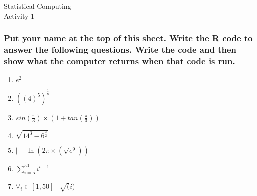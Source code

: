 \documentclass[11pt]{article}
\begin{document}
\begin{center}
{\large    Statistical Computing\\
   Activity 1 }
\end{center}

\subsubsection*{Put your name at the top of this sheet. Write the R code to answer the following questions. Write the code and then show what the computer returns when that code is run.}

\flushleft
\begin{enumerate}
\item $e^2$ \vspace{12mm}
\item $((4)^5)^\frac{1}{8}$ \vspace{20mm}
\item $sin(\frac{\pi}{3}) \times (1 + tan(\frac{\pi}{3}))$ \vspace{12mm}
\item $\sqrt{14^3 - 6^\frac{3}{2}} $ \vspace{12mm}
\item $\mid-\ln(2\pi \times (\sqrt{e^9}))\mid$ \vspace{12mm}
\item $\sum_{i=5}^{50}i^{i-1}$ \vspace{12mm}
\item $\forall_{i}\in[1,50] \;\;\; \sqrt(i)$
\end{enumerate}

\newpage
\end{document}

